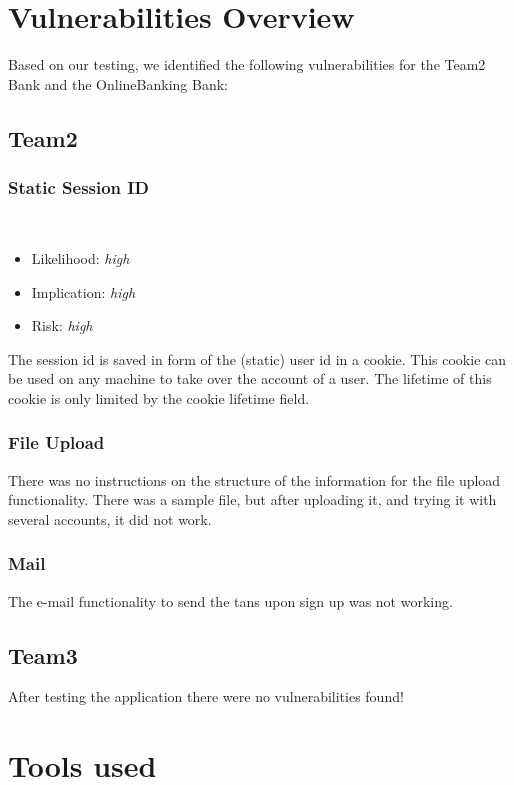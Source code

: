 \documentclass[headsepline,footsepline,footinclude=false,oneside,fontsize=11pt,paper=a4,listof=totoc,bibliography=totoc]{scrbook} %
\begin{document}
%

\chapter{Vulnerabilities Overview}
Based on our testing, we identified the following vulnerabilities for the Team2
Bank and the OnlineBanking Bank:
\section{Team2}

\subsection{Static Session ID} \
\begin{itemize}
	\item Likelihood: \textit{high}
	\item Implication: \textit{high}
	\item Risk: \textit{high} 
\end{itemize}

The session id is saved in form of the (static) user id in a cookie. This cookie can be used on any machine
to take over the account of a user. The lifetime of this cookie is only limited by the cookie lifetime field.

\subsection{File Upload} 
There was no instructions on the structure of the information for the file upload functionality. There was a sample file, but after uploading it, and trying it with several accounts, it did not work.

\subsection{Mail}
The e-mail functionality to send the tans upon sign up was not working.


\section{Team3}

After testing the application there were no vulnerabilities found!

 

\chapter{Tools used}
\end{document}
